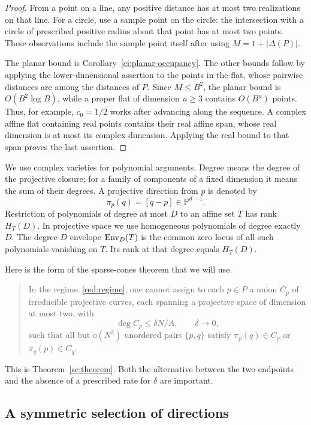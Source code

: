 \begin{proof}
From a point on a line, any positive distance has at most two realizations
on that line. For a circle, use a sample point on the circle: the
intersection with a circle of prescribed positive radius about that
point has at most two points. These observations include the sample
point itself after using \(M=1+|\Delta(P)|\).

The planar bound is Corollary~\ref{ci:planar-occupancy}. The other bounds
follow by applying the lower-dimensional assertion to the points in
the flat, whose pairwise distances are among the distances of \(P\).
Since \(M\le B^2\), the planar bound is \(O(B^2\log B)\), while a proper
flat of dimension \(u\ge3\) contains \(O(B^u)\) points. Thus, for example,
\(c_0=1/2\) works after advancing along the sequence. A complex affine
flat containing real points contains their real affine span, whose
real dimension is at most its complex dimension. Applying the real
bound to that span proves the last assertion.
\end{proof}

We use complex varieties for polynomial arguments. Degree means the
degree of the projective closure; for a family of components of a fixed
dimension it means the sum of their degrees. A projective direction
from \(p\) is denoted by
\[
 \pi_p(q)=[q-p]\in\mathbb P^{d-1}.
\]
Restriction of polynomials of degree at most \(D\) to an affine set
\(T\) has rank \(H_T(D)\). In projective space we use homogeneous
polynomials of degree exactly \(D\). The degree-\(D\) envelope
\(\operatorname{Env}_D(T)\) is the common zero locus of all such polynomials
vanishing on \(T\). Its rank at that degree equals \(H_T(D)\).

Here is the form of the sparse-cones theorem that we will use.

\begin{quote}
In the regime~\eqref{red:regime}, one cannot assign to each \(p\in P\)
a union \(C_p\) of irreducible projective curves, each spanning a
projective space of dimension at most two, with
\[
 \deg C_p\le\delta N/A,\qquad\delta\to0,
\]
such that all but \(o(N^2)\) unordered pairs \(\{p,q\}\) satisfy
\(\pi_p(q)\in C_p\) or \(\pi_q(p)\in C_q\).
\end{quote}
This is Theorem~\ref{sc:theorem}. Both the alternative between the two
endpoints and the absence of a prescribed rate for \(\delta\) are
important.

\subsection{A symmetric selection of directions}

